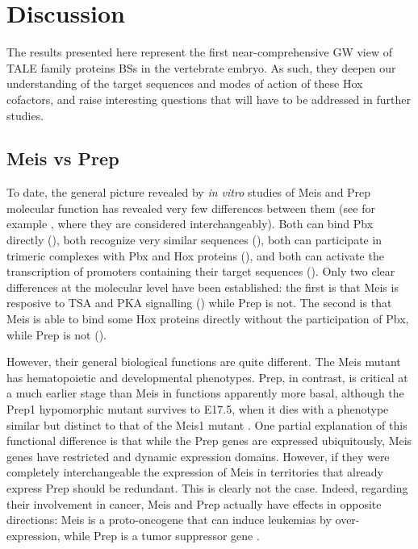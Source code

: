 \chapter{Discussion}
\label{chp:discussion}

The results presented here represent the first near-comprehensive \ac{GW} view of \ac{TALE} family proteins \acp{BS} in the vertebrate embryo. As such, they deepen our understanding of the target sequences and modes of action of these Hox cofactors, and raise interesting questions that will have to be addressed in further studies. 

\section{Meis vs Prep}

To date, the general picture revealed by \textit{in vitro} studies of Meis and Prep molecular function has revealed very few differences between them (see for example \textcite{Moens2006}, where they are considered interchangeably). Both can bind Pbx directly (\cite{Knoepfler1997, Shen1997}), both recognize very similar sequences (\cite{Knoepfler1997, Chang1997}), both can participate in trimeric complexes with Pbx and Hox proteins (\cite{Berthelsen1998, Shen1999}), and both can activate the transcription of promoters containing their target sequences (\cite{Berthelsen1998, Jacobs1999}). Only two clear differences at the molecular level have been established: the first is that Meis is resposive to \ac{TSA} and \ac{PKA} signalling (\cite{Huang2005}) while Prep is not. The second is that Meis is able to bind some Hox proteins directly without the participation of Pbx, while Prep is not (\cite{Williams2005}).

However, their general biological functions are quite different. The Meis mutant has hematopoietic and developmental phenotypes. Prep, in contrast, is critical at a much earlier stage than Meis in functions apparently more basal, although the Prep1 hypomorphic mutant survives to E17.5, when it dies with a phenotype similar but distinct to that of the Meis1 mutant \parencite{Ferretti2006, DiRosa2007}. One partial explanation of this functional difference is that while the Prep genes are expressed ubiquitously, Meis genes have restricted and dynamic expression domains. However, if they were completely interchangeable the expression of Meis in territories that already express Prep should be redundant. This is clearly not the case. Indeed, regarding their involvement in cancer, Meis and Prep actually have effects in opposite directions: Meis is a proto-oncogene that can induce leukemias by over-expression, while Prep is a tumor suppressor gene \parencite{Moskow1995, Thorsteinsdottir2001, Iotti2011, Longobardi2010, Wong2007}. %

